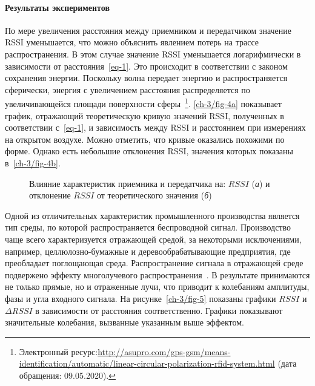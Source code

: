 \paragraph{Результаты экспериментов}

По мере увеличения расстояния между приемником и передатчиком значение RSSI уменьшается, что можно объяснить явлением потерь на трассе распространения. В этом случае значение RSSI уменьшается логарифмически в зависимости от расстояния~\cref{eq-1}. Это происходит в соответствии с законом сохранения энергии. Поскольку волна передает энергию и распространяется сферически, энергия с увеличением расстояния распределяется по увеличивающейся площади поверхности сферы~\footnote{Электронный ресурс:{\tiny\url{http://asupro.com/gps-gsm/means-identification/automatic/linear-circular-polarization-rfid-system.html}} (дата обращения: 09.05.2020).}. \cref{ch-3/fig-4a} показывает график, отражающий теоретическую кривую значений RSSI, полученных в соответствии с~\cref{eq-1}, и зависимость между RSSI и расстоянием при измерениях на открытом воздухе. Можно отметить, что кривые оказались похожими по форме. Однако есть небольшие отклонения RSSI, значения которых показаны в~\cref{ch-3/fig-4b}.

\begin{figure}[!htb]
	\centering
	\caption[Влияние характеристик приемника и передатчика на RSSI и отклонение $RSSI$ от теоретического значения]{Влияние характеристик приемника и передатчика на: $RSSI$ (\textit{а}) и отклонение $RSSI$ от теоретического значения (\textit{б})}
\end{figure}

Одной из отличительных характеристик промышленного производства является тип среды, по которой распространяется беспроводной сигнал. Производство чаще всего характеризуется отражающей средой, за некоторыми исключениями, например, целлюлозно-бумажные и деревообрабатывающие предприятия, где преобладает поглощающая среда. Распространение сигнала в отражающей среде подвержено эффекту многолучевого распространения~\cite{7433518}. В результате принимаются не только прямые, но и отраженные лучи, что приводит к колебаниям амплитуды, фазы и угла входного сигнала. На рисунке~\cref{ch-3/fig-5} показаны графики $RSSI$ и $\Delta RSSI$ в зависимости от расстояния соответственно. Графики показывают значительные колебания, вызванные указанным выше эффектом.

